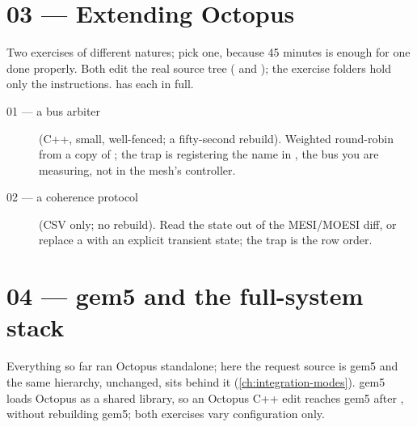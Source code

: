\section{03 --- Extending Octopus}

Two exercises of different natures; pick one, because 45 minutes is enough for one done
properly. Both edit the real source tree ( and
); the exercise folders hold only the
instructions.  has each in full.

\begin{description}
\item[01 --- a bus arbiter] (C++, small, well-fenced; a fifty-second rebuild). Weighted
  round-robin from a copy of ; the trap is registering the name in
  , the bus you are measuring, not in the mesh's controller.
\item[02 --- a coherence protocol] (CSV only; no rebuild). Read the  state out of the
  MESI/MOESI diff, or replace a  with an explicit transient state; the trap is the
  row order.
\end{description}

\section{04 --- gem5 and the full-system stack}

Everything so far ran Octopus standalone; here the request source is gem5 and the same
hierarchy, unchanged, sits behind it (\cref{ch:integration-modes}). gem5 loads Octopus as a
shared library, so an Octopus C++ edit reaches gem5 after , without
rebuilding gem5; both exercises vary configuration only.


